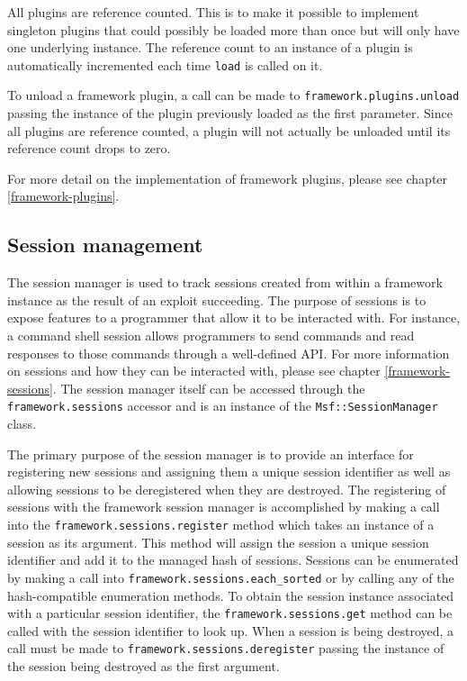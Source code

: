 \documentclass{report}
\begin{document}
\par
All plugins are reference counted.  This is to make it possible to
implement singleton plugins that could possibly be loaded more than
once but will only have one underlying instance.  The reference
count to an instance of a plugin is automatically incremented each
time \texttt{load} is called on it.

\par
To unload a framework plugin, a call can be made to
\texttt{framework.plugins.unload} passing the instance of the plugin
previously loaded as the first parameter.  Since all plugins are
reference counted, a plugin will not actually be unloaded until its
reference count drops to zero.

\par
For more detail on the implementation of framework plugins, please
see chapter \ref{framework-plugins}.

        \subsection{Session management}

\par
The session manager is used to track sessions created from within a
framework instance as the result of an exploit succeeding.  The
purpose of sessions is to expose features to a programmer that allow
it to be interacted with.  For instance, a command shell session
allows programmers to send commands and read responses to those
commands through a well-defined API.  For more information on
sessions and how they can be interacted with, please see chapter
\ref{framework-sessions}.  The session manager itself can be
accessed through the \texttt{framework.sessions} accessor and is an
instance of the \texttt{Msf::SessionManager} class.

\par
The primary purpose of the session manager is to provide an
interface for registering new sessions and assigning them a unique
session identifier as well as allowing sessions to be deregistered
when they are destroyed.  The registering of sessions with the
framework session manager is accomplished by making a call into the
\texttt{framework.sessions.register} method which takes an instance
of a session as its argument.  This method will assign the session a
unique session identifier and add it to the managed hash of
sessions.  Sessions can be enumerated by making a call into
\texttt{framework.sessions.each\_sorted} or by calling any of the
hash-compatible enumeration methods.  To obtain the session instance
associated with a particular session identifier, the
\texttt{framework.sessions.get} method can be called with the
session identifier to look up.  When a session is being destroyed, a
call must be made to \texttt{framework.sessions.deregister} passing
the instance of the session being destroyed as the first argument.
\end{document}
